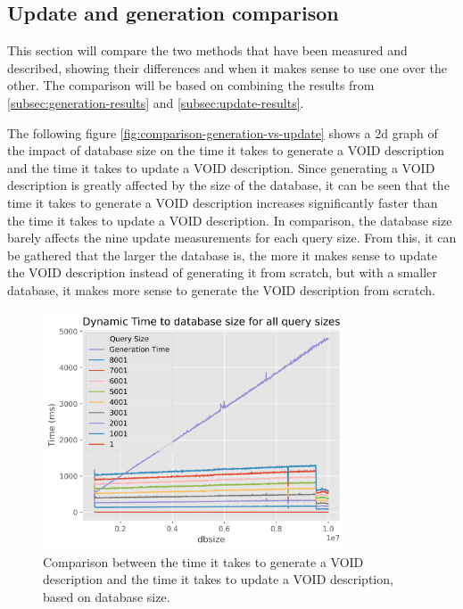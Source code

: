 \subsection{Update and generation comparison}\label{subsec:update-generation-comparison}
This section will compare the two methods that have been measured and described, showing their differences and when it makes sense to use one over the other. The comparison will be based on combining the results from \autoref{subsec:generation-results} and \autoref{subsec:update-results}.

The following figure \autoref{fig:comparison-generation-vs-update} shows a 2d graph of the impact of database size on the time it takes to generate a VOID description and the time it takes to update a VOID description. Since generating a VOID description is greatly affected by the size of the database, it can be seen that the time it takes to generate a VOID description increases significantly faster than the time it takes to update a VOID description. In comparison, the database size barely affects the nine update measurements for each query size. From this, it can be gathered that the larger the database is, the more it makes sense to update the VOID description instead of generating it from scratch, but with a smaller database, it makes more sense to generate the VOID description from scratch.


\begin{figure}
    \centering
    \includegraphics[width=0.8\textwidth]{figures/comparison-Generation-vs-Update.png}
    \caption{Comparison between the time it takes to generate a VOID description and the time it takes to update a VOID description, based on database size.}
    \label{fig:comparison-generation-vs-update}
\end{figure}


